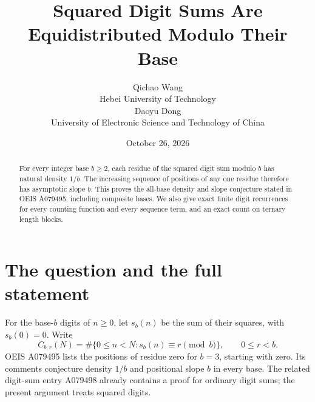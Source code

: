 \documentclass[10pt]{article}
\title{Squared Digit Sums Are Equidistributed Modulo Their Base}
\author{Qichao Wang\\{\small Hebei University of Technology}\\[0.3em]
Daoyu Dong\\{\small University of Electronic Science and Technology of China}}
\date{October 26, 2026}
\begin{document}
\maketitle
\begin{abstract}
For every integer base $b\ge2$, each residue of the squared digit sum
modulo $b$ has natural density $1/b$. The increasing sequence of
positions of any one residue therefore has asymptotic slope $b$.
This proves the all-base density and slope conjecture stated in
OEIS A079495, including composite bases. We also give exact finite
digit recurrences for every counting function and every sequence
term, and an exact count on ternary length blocks.
\end{abstract}

\section{The question and the full statement}
For the base-$b$ digits of $n\ge0$, let $s_b(n)$ be the sum of their
squares, with $s_b(0)=0$. Write
\[
 C_{b,r}(N)=\#\{0\le n<N:s_b(n)\equiv r\pmod b\},
 \qquad 0\le r<b.
\]
OEIS A079495 \cite{target} lists the positions of residue zero for
$b=3$, starting with zero. Its comments conjecture density $1/b$
and positional slope $b$ in every base. The related digit-sum
entry A079498 \cite{linear} already contains a proof for ordinary
digit sums; the present argument treats squared digits.
\end{document}
